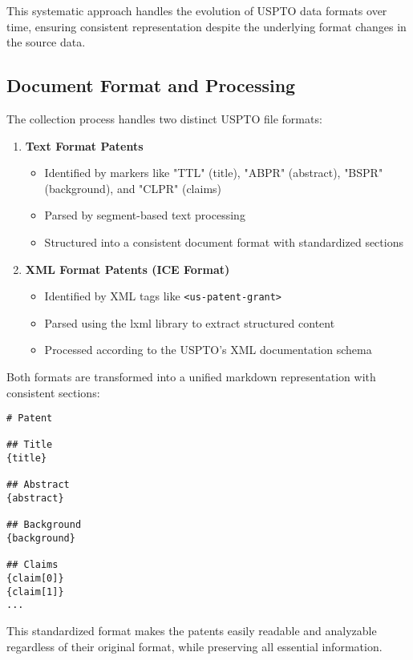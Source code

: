 This systematic approach handles the evolution of USPTO data formats over time, ensuring consistent representation despite the underlying format changes in the source data.

\subsection{Document Format and Processing}

The collection process handles two distinct USPTO file formats:

\begin{enumerate}
    \item \textbf{Text Format Patents}
    \begin{itemize}
        \item Identified by markers like "TTL" (title), "ABPR" (abstract), "BSPR" (background), and "CLPR" (claims)
        \item Parsed by segment-based text processing
        \item Structured into a consistent document format with standardized sections
    \end{itemize}
    
    \item \textbf{XML Format Patents (ICE Format)}
    \begin{itemize}
        \item Identified by XML tags like \texttt{<us-patent-grant>}
        \item Parsed using the lxml library to extract structured content
        \item Processed according to the USPTO's XML documentation schema
    \end{itemize}
\end{enumerate}

Both formats are transformed into a unified markdown representation with consistent sections:

\begin{verbatim}
# Patent

## Title
{title}

## Abstract
{abstract}

## Background
{background}

## Claims
{claim[0]}
{claim[1]}
...
\end{verbatim}

This standardized format makes the patents easily readable and analyzable regardless of their original format, while preserving all essential information.

